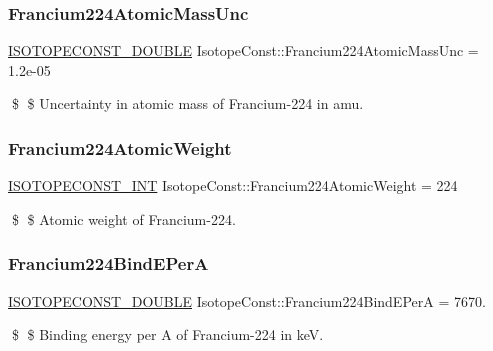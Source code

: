 \subsubsection{\texorpdfstring{Francium224\+Atomic\+Mass\+Unc}{Francium224AtomicMassUnc}}
{\footnotesize\ttfamily \mbox{\hyperlink{group___isotope_const-_macros_ga8f45a7272ce02c0b4c65c44636ed719a}{I\+S\+O\+T\+O\+P\+E\+C\+O\+N\+S\+T\+\_\+\+D\+O\+U\+B\+LE}} Isotope\+Const\+::\+Francium224\+Atomic\+Mass\+Unc = 1.\+2e-\/05}

\$ \$ Uncertainty in atomic mass of Francium-\/224 in amu. \mbox{\label{group___isotope_const-_francium-_fr224_ga10a8074eed03ee8047ef9aafe5699488}} 
\subsubsection{\texorpdfstring{Francium224\+Atomic\+Weight}{Francium224AtomicWeight}}
{\footnotesize\ttfamily \mbox{\hyperlink{group___isotope_const-_macros_ga5f18360b3e99483a35c32d789e62621c}{I\+S\+O\+T\+O\+P\+E\+C\+O\+N\+S\+T\+\_\+\+I\+NT}} Isotope\+Const\+::\+Francium224\+Atomic\+Weight = 224}

\$ \$ Atomic weight of Francium-\/224. \mbox{\label{group___isotope_const-_francium-_fr224_ga3f499d37e2a55f9a3a1b5cfdfbf9172f}} 
\subsubsection{\texorpdfstring{Francium224\+Bind\+E\+PerA}{Francium224BindEPerA}}
{\footnotesize\ttfamily \mbox{\hyperlink{group___isotope_const-_macros_ga8f45a7272ce02c0b4c65c44636ed719a}{I\+S\+O\+T\+O\+P\+E\+C\+O\+N\+S\+T\+\_\+\+D\+O\+U\+B\+LE}} Isotope\+Const\+::\+Francium224\+Bind\+E\+PerA = 7670.}

\$ \$ Binding energy per A of Francium-\/224 in keV. \mbox{\label{group___isotope_const-_francium-_fr224_ga9c0c5d632e07a07279a02c6f290044e2}} 
